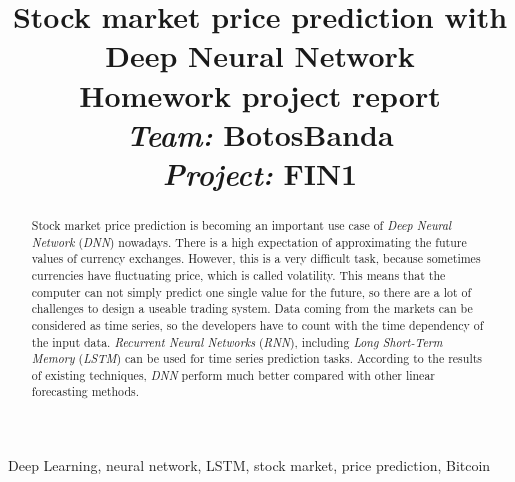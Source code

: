 \documentclass[conference]{IEEEtran}
\begin{document}
\title{Stock market price prediction with Deep Neural Network\\
{\large \textbf{Homework project report}}\\
{\large \textit{Team:} BotosBanda}\\
{\large \textit{Project:} FIN1}
}

\author{
\and
{}
\and
{}
}

\maketitle

\begin{abstract}

Stock market price prediction is becoming an important use case of \emph{Deep Neural Network} (\emph{DNN}) nowadays. There is a high expectation of approximating the future values of currency exchanges. However, this is a very difficult task, because sometimes currencies have fluctuating price, which is called volatility. This means that the computer can not simply predict one single value for the future, so there are a lot of challenges to design a useable trading system. Data coming from the markets can be considered as time series, so the developers have to count with the time dependency of the input data. \emph{Recurrent Neural Networks} (\emph{RNN}), including \emph{Long Short-Term Memory} (\emph{LSTM}) can be used for time series prediction tasks. According to the results of existing techniques, \emph{DNN} perform much better compared with other linear forecasting methods.

\end{abstract}

\begin{IEEEkeywords}
Deep Learning, neural network, LSTM, stock market, price prediction, Bitcoin
\end{IEEEkeywords}
\end{document}
